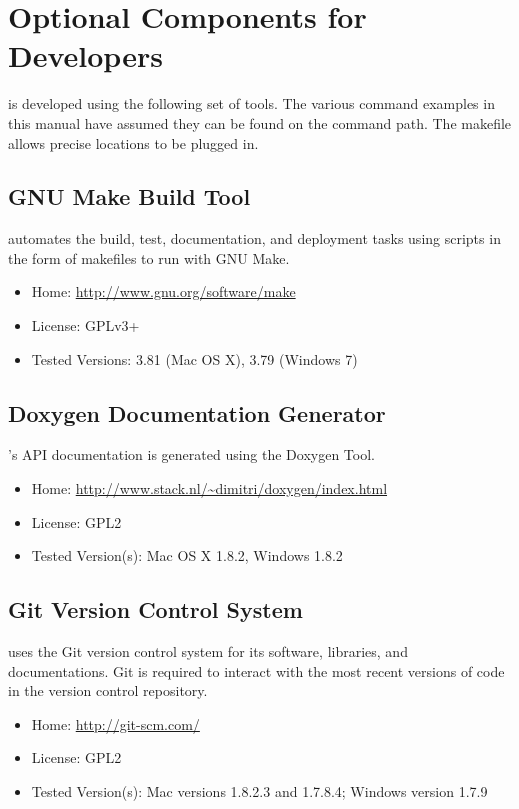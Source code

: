 \section{Optional Components for Developers}

\CmdStan is developed using the following set of tools.  The various
command examples in this manual have assumed they can be found on
the command path.  The makefile allows precise locations to be plugged
in. 

\subsection{GNU Make Build Tool}

\CmdStan automates the build, test, documentation, and deployment tasks
using scripts in the form of makefiles to run with GNU Make.
%
\begin{itemize}
\item Home: \url{http://www.gnu.org/software/make}
\item License: GPLv3+
\item Tested Versions: 3.81 (Mac OS X), 3.79 (Windows 7)
\end{itemize}
%


\subsection{Doxygen Documentation Generator}

\CmdStan's API documentation is generated using the Doxygen Tool.
%
\begin{itemize}
\item Home: \url{http://www.stack.nl/~dimitri/doxygen/index.html}
\item License: GPL2
\item Tested Version(s): Mac OS X 1.8.2, Windows 1.8.2
\end{itemize}


\subsection{Git Version Control System}

\CmdStan uses the Git version control system for its software, libraries,
and documentations.  Git is required to interact with the most recent
versions of code in the version control repository.
% 
\begin{itemize}
\item Home: \url{http://git-scm.com/}
\item License: GPL2
\item Tested Version(s): Mac versions 1.8.2.3 and 1.7.8.4; Windows version 1.7.9
\end{itemize}


